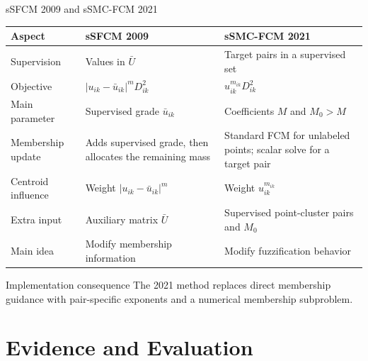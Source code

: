 \documentclass[t,aspectratio=169]{beamer}
\begin{document}
\begin{frame}{sSFCM 2009 and sSMC-FCM 2021}
  \centering
  \footnotesize
  \setlength{\tabcolsep}{3pt}
  \renewcommand{\arraystretch}{1.22}
  \begin{tabular}{p{2.15cm}|p{5.55cm}|p{5.55cm}}
    \textbf{Aspect} & \textbf{sSFCM 2009} & \textbf{sSMC-FCM 2021} \\
    \hline
    Supervision & Values in $\bar U$ & Target pairs in a supervised set \\
    Objective & $|u_{ik}-\bar u_{ik}|^mD_{ik}^2$ & $u_{ik}^{m_{ik}}D_{ik}^2$ \\
    Main parameter & Supervised grade $\bar u_{ik}$ & Coefficients $M$ and $M_0>M$ \\
    Membership update & Adds supervised grade, then allocates the remaining mass & Standard FCM for unlabeled points; scalar solve for a target pair \\
    Centroid influence & Weight $|u_{ik}-\bar u_{ik}|^m$ & Weight $u_{ik}^{m_{ik}}$ \\
    Extra input & Auxiliary matrix $\bar U$ & Supervised point-cluster pairs and $M_0$ \\
    Main idea & Modify membership information & Modify fuzzification behavior \\
  \end{tabular}

  \vspace{0.5em}
  \begin{alertblock}{Implementation consequence}
    The 2021 method replaces direct membership guidance with pair-specific exponents and a numerical membership subproblem.
  \end{alertblock}
\end{frame}

\section{Evidence and Evaluation}
\end{document}
